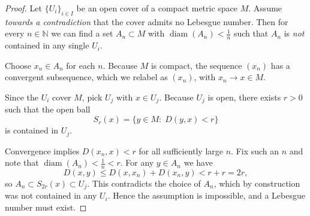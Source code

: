 \documentclass[12pt]{article}
\theoremstyle{definition} %
\theoremstyle{plain} %
\begin{document}
  \begin{proof}
  Let $\{U_i\}_{i\in I}$ be an open cover of a compact metric space $M$.
  Assume \emph{towards a contradiction} that the cover admits no Lebesgue number.
  Then for every $n\in\mathbb{N}$ we can find a set $A_n\subset M$ with
  $\operatorname{diam}(A_n)<\frac1n$ such that $A_n$ is \emph{not} contained
  in any single $U_i$.
  
  Choose $x_n\in A_n$ for each $n$.
  Because $M$ is compact, the sequence $(x_n)$
  has a convergent subsequence, which we relabel as $(x_n)$, with
  $x_n\to x\in M$.
  
  Since the $U_i$ cover $M$, pick $U_j$ with $x\in U_j$.
  Because $U_j$ is open, there exists $r>0$ such that the open ball
  \[
  S_r(x)=\{y\in M:\;D(y,x)<r\}
  \]
  is contained in $U_j$.
  
  Convergence implies $D(x_n,x)<r$ for all sufficiently large $n$.
  Fix such an $n$ and note that
  $\operatorname{diam}(A_n)<\frac1n<r$.  For any $y\in A_n$ we have
  \[
  D(x,y)\le D(x,x_n)+D(x_n,y)<r+r=2r,
  \]
  so $A_n\subset S_{2r}(x)\subset U_j$.
  This contradicts the choice of $A_n$, which by construction was not
  contained in any $U_i$.
  Hence the assumption is impossible, and a Lebesgue number must exist.
  \end{proof}
\end{document}
